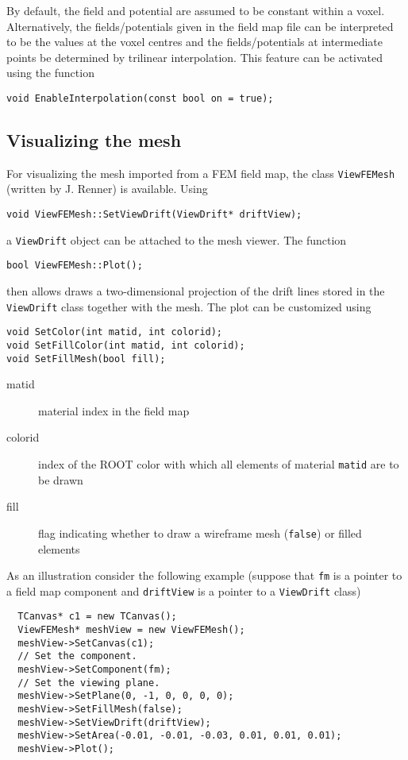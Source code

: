 By default, the field and potential are assumed to be constant within 
a voxel. Alternatively, the fields/potentials given in the field map file
can be interpreted to be the values at the voxel centres and the 
fields/potentials at intermediate points be determined by trilinear interpolation.
This feature can be activated using the function
\begin{lstlisting}
void EnableInterpolation(const bool on = true);
\end{lstlisting} 
 
\subsection{Visualizing the mesh}

For visualizing the mesh imported from a FEM field map, the class 
\texttt{ViewFEMesh} (written by J. Renner) is available. 
Using 
\begin{lstlisting}
void ViewFEMesh::SetViewDrift(ViewDrift* driftView);
\end{lstlisting}
a \texttt{ViewDrift} object can be attached to the mesh viewer. 
The function
\begin{lstlisting}
bool ViewFEMesh::Plot();
\end{lstlisting}
then allows draws a two-dimensional projection of the drift lines stored in the  
\texttt{ViewDrift} class together with the mesh. 
The plot can be customized using 
\begin{lstlisting}
void SetColor(int matid, int colorid);
void SetFillColor(int matid, int colorid);
void SetFillMesh(bool fill);
\end{lstlisting}
\begin{description}
  \item[matid] material index in the field map
  \item[colorid] index of the ROOT color with which all elements of material 
                 \texttt{matid} are to be drawn 
  \item[fill] flag indicating whether to draw a wireframe mesh (\texttt{false}) 
              or filled elements
\end{description}
As an illustration consider the following example 
(suppose that \texttt{fm} is a pointer to a field map component 
and \texttt{driftView} is a pointer to a \texttt{ViewDrift} class) 
\begin{lstlisting}
  TCanvas* c1 = new TCanvas();
  ViewFEMesh* meshView = new ViewFEMesh();
  meshView->SetCanvas(c1);
  // Set the component.
  meshView->SetComponent(fm);
  // Set the viewing plane.
  meshView->SetPlane(0, -1, 0, 0, 0, 0);
  meshView->SetFillMesh(false);
  meshView->SetViewDrift(driftView);
  meshView->SetArea(-0.01, -0.01, -0.03, 0.01, 0.01, 0.01);
  meshView->Plot();
\end{lstlisting}

